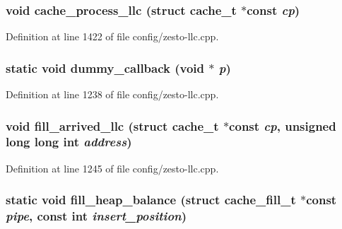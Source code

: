 \subsubsection[{cache\_\-process\_\-llc}]{\setlength{\rightskip}{0pt plus 5cm}void cache\_\-process\_\-llc (struct {\bf cache\_\-t} $\ast$const  {\em cp})}\label{config_2zesto-llc_8cpp_7b2967a29a17913e313fceec0d9dbd4c}




Definition at line 1422 of file config/zesto-llc.cpp.
\subsubsection[{dummy\_\-callback}]{\setlength{\rightskip}{0pt plus 5cm}static void dummy\_\-callback (void $\ast$ {\em p})\hspace{0.3cm}{\tt  [static]}}\label{config_2zesto-llc_8cpp_2ca1ae8eb0053c08276d5e170a5f98d8}




Definition at line 1238 of file config/zesto-llc.cpp.
\subsubsection[{fill\_\-arrived\_\-llc}]{\setlength{\rightskip}{0pt plus 5cm}void fill\_\-arrived\_\-llc (struct {\bf cache\_\-t} $\ast$const  {\em cp}, \/  unsigned long long int {\em address})}\label{config_2zesto-llc_8cpp_f1f903df28f067bfd63f3145c04a5870}




Definition at line 1245 of file config/zesto-llc.cpp.
\subsubsection[{fill\_\-heap\_\-balance}]{\setlength{\rightskip}{0pt plus 5cm}static void fill\_\-heap\_\-balance (struct {\bf cache\_\-fill\_\-t} $\ast$const  {\em pipe}, \/  const int {\em insert\_\-position})\hspace{0.3cm}{\tt  [static]}}\label{config_2zesto-llc_8cpp_45008d7fc6cedc3c5187a70e4cfc1d4a}




